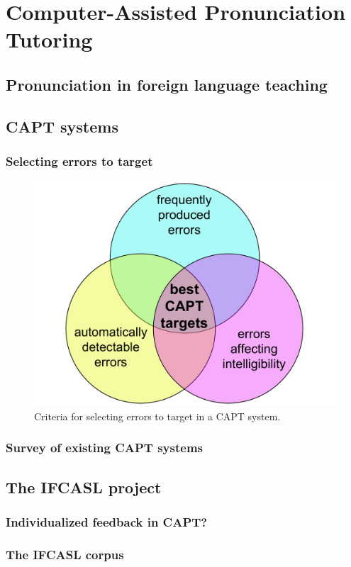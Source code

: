 %
%

\chapter{Computer-Assisted Pronunciation Tutoring}


\blindtext 
\section{Pronunciation in foreign language teaching}
\blindtext
\section{CAPT systems}
	\subsection{Selecting errors to target}
	\blindtext
		\begin{center}
		\begin{figure}[htb]
			\includegraphics[width=.7\textwidth]{../img/error-venn}
			\caption{Criteria for selecting errors to target in a CAPT system.}
			\label{fig:errors}
		\end{figure}
		\end{center}
	\subsection{Survey of existing CAPT systems}
	
\section{The IFCASL project}
	\subsection{Individualized feedback in CAPT?}
	\subsection{The IFCASL corpus}

